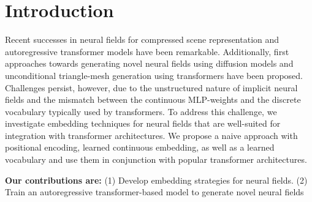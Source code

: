 \section{Introduction}
\label{sec:intro}

Recent successes in neural fields for compressed scene representation and autoregressive transformer models have been remarkable.
Additionally, first approaches towards generating novel neural fields using diffusion models \cite{erkoç2023hyperdiffusion} and unconditional triangle-mesh generation using transformers \cite{siddiqui2023meshgpt} have been proposed.
Challenges persist, however, due to the unstructured nature of implicit neural fields and the mismatch between the continuous MLP-weights and the discrete vocabulary typically used by transformers.
To address this challenge, we investigate embedding techniques for neural fields that are well-suited for integration with transformer architectures. We propose a naive approach with positional encoding, learned continuous embedding, as well as a learned vocabulary and use them in conjunction with popular transformer architectures.



\noindent \textbf{Our contributions are: } (1) Develop embedding strategies for neural fields. (2) Train an autoregressive transformer-based model to generate novel neural fields